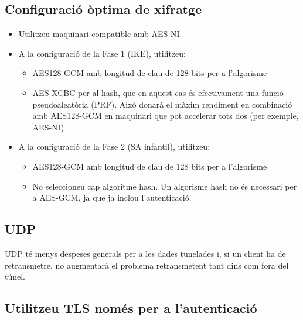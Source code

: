 \documentclass[
  10pt,
]{krantz}
\providecommand{\tightlist}{%
  \setlength{\itemsep}{0pt}\setlength{\parskip}{0pt}}
\begin{document}
\hypertarget{configuraciuxf3-uxf2ptima-de-xifratge}{%
\subsection{Configuració òptima de xifratge}\label{configuraciuxf3-uxf2ptima-de-xifratge}}

\begin{itemize}
\tightlist
\item
  Utilitzeu maquinari compatible amb AES-NI.
\item
  A la configuració de la Fase 1 (IKE), utilitzeu:

  \begin{itemize}
  \tightlist
  \item
    AES128-GCM amb longitud de clau de 128 bits per a l'algorisme
  \item
    AES-XCBC per al hash, que en aquest cas és efectivament una funció pseudoaleatòria (PRF). Això donarà el màxim rendiment en combinació amb AES128-GCM en maquinari que pot accelerar tots dos (per exemple, AES-NI)
  \end{itemize}
\item
  A la configuració de la Fase 2 (SA infantil), utilitzeu:

  \begin{itemize}
  \tightlist
  \item
    AES128-GCM amb longitud de clau de 128 bits per a l'algorisme
  \item
    No seleccioneu cap algoritme hash. Un algorisme hash no és necessari per a AES-GCM, ja que ja inclou l'autenticació.
  \end{itemize}
\end{itemize}

\hypertarget{udp}{%
\subsection{UDP}\label{udp}}

UDP té menys despeses generals per a les dades tunelades i, si un client ha de retransmetre, no augmentarà el problema retransmetent tant dins com fora del túnel.

\hypertarget{utilitzeu-tls-nomuxe9s-per-a-lautenticaciuxf3}{%
\subsection{Utilitzeu TLS només per a l'autenticació}\label{utilitzeu-tls-nomuxe9s-per-a-lautenticaciuxf3}}
\end{document}
